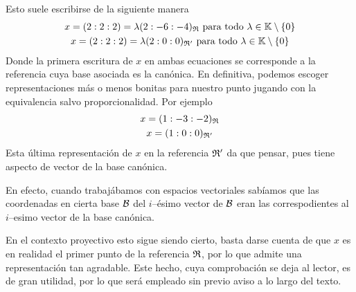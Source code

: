\begin{exa}
	Esto suele escribirse de la siguiente manera
	\begin{gather*}
		x=(2:2:2)=\lambda(2:-6:-4)_{\mathfrak{R}}\text{ para todo } \lambda\in\mathbb{K}\setminus\{0\}\\
		x=(2:2:2)=\lambda(2:0:0)_{\mathfrak{R}'}\text{ para todo } \lambda\in\mathbb{K}\setminus\{0\}
	\end{gather*}
	Donde la primera escritura de $x$ en ambas ecuaciones se corresponde a la referencia cuya base asociada es la canónica. En definitiva, podemos escoger representaciones más o menos bonitas para nuestro punto jugando con la equivalencia salvo proporcionalidad. Por ejemplo
	\begin{gather*}
		x=(1:-3:-2)_{\mathfrak{R}}\\
		x=(1:0:0)_{\mathfrak{R}'}
	\end{gather*}
	Esta última representación de $x$ en la referencia $\mathfrak{R}'$ da que pensar, pues tiene aspecto de vector de la base canónica.
	
	 En efecto, cuando trabajábamos con espacios vectoriales sabíamos que las coordenadas en cierta base $\mathcal{B}$ del $i$--ésimo vector de $\mathcal{B}$ eran las correspodientes al $i$--esimo vector de la base canónica.
	 
	 En el contexto proyectivo esto sigue siendo cierto, basta darse cuenta de que $x$ es en realidad el primer punto de la referencia $\mathfrak{R}$, por lo que admite una representación tan agradable. Este hecho, cuya comprobación se deja al lector, es de gran utilidad, por lo que será empleado sin previo aviso a lo largo del texto. 
\end{exa}
